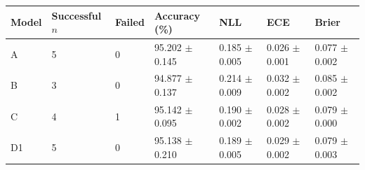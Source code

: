 \begin{tabular}{lllllll}
\toprule
Model & Successful $n$ & Failed & Accuracy (\%) & NLL & ECE & Brier \\
\midrule
A & 5 & 0 & 95.202 $\pm$ 0.145 & 0.185 $\pm$ 0.005 & 0.026 $\pm$ 0.001 & 0.077 $\pm$ 0.002 \\
B & 3 & 0 & 94.877 $\pm$ 0.137 & 0.214 $\pm$ 0.009 & 0.032 $\pm$ 0.002 & 0.085 $\pm$ 0.002 \\
C & 4 & 1 & 95.142 $\pm$ 0.095 & 0.190 $\pm$ 0.002 & 0.028 $\pm$ 0.002 & 0.079 $\pm$ 0.000 \\
D1 & 5 & 0 & 95.138 $\pm$ 0.210 & 0.189 $\pm$ 0.005 & 0.029 $\pm$ 0.002 & 0.079 $\pm$ 0.003 \\
\bottomrule
\end{tabular}
